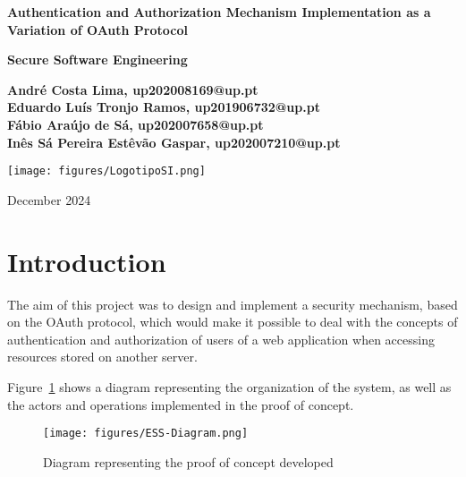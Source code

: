 \documentclass[10pt]{article}
\begin{document}
\begin{titlepage}
   \begin{center}
       \vspace*{1cm}
       {\fontsize{17}{20}\selectfont\textbf{Authentication and Authorization Mechanism Implementation as a Variation of OAuth Protocol}}

       \vspace{0.5cm}
       \textbf{Secure Software Engineering}
            
       \vspace{1.5cm}

       \textbf{André Costa Lima, up202008169@up.pt}\\
       \textbf{Eduardo Luís Tronjo Ramos, up201906732@up.pt}\\
       \textbf{Fábio Araújo de Sá, up202007658@up.pt}\\
       \textbf{Inês Sá Pereira Estêvão Gaspar, up202007210@up.pt}\\
       
       \vfill
            
       \texttt{[image: figures/LogotipoSI.png]}
        
       \vspace{2cm}
            
       December 2024
            
   \end{center}
\end{titlepage}

\tableofcontents
\clearpage

\section{Introduction}

The aim of this project was to design and implement a security mechanism, based on the OAuth protocol, which would make it possible to deal with the concepts of authentication and authorization of users of a web application when accessing resources stored on another server.

Figure~\ref{fig:validation3} shows a diagram representing the organization of the system, as well as the actors and operations implemented in the proof of concept.

\begin{center}
    \begin{figure}[H]
        \centering
        \texttt{[image: figures/ESS-Diagram.png]}
            \caption{Diagram representing the proof of concept developed}
        \label{fig:validation3}
    \end{figure}
\end{center}
\end{document}
